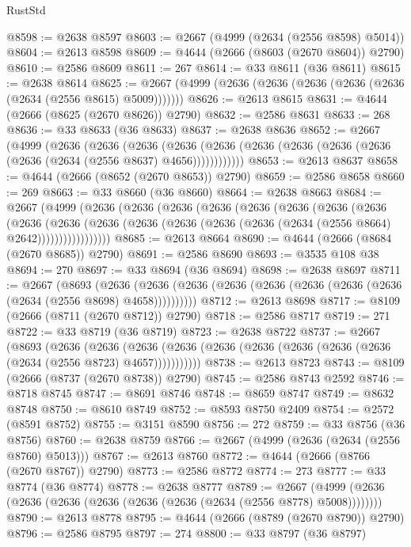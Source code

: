 \begin{lexlean}{RustStd}
\begin{coremodule}
@8598 := @2638 @8597
@8603 := @2667 (@4999 (@2634 (@2556 @8598) @5014))
@8604 := @2613 @8598
@8609 := @4644 (@2666 (@8603 (@2670 @8604)) @2790)
@8610 := @2586 @8609
@8611 := 267
@8614 := @33 @8611 (@36 @8611)
@8615 := @2638 @8614
@8625 := @2667 (@4999 (@2636 (@2636 (@2636 (@2636 (@2636 (@2634 (@2556 @8615) @5009)))))))
@8626 := @2613 @8615
@8631 := @4644 (@2666 (@8625 (@2670 @8626)) @2790)
@8632 := @2586 @8631
@8633 := 268
@8636 := @33 @8633 (@36 @8633)
@8637 := @2638 @8636
@8652 := @2667
    (@4999
      (@2636
        (@2636
          (@2636
            (@2636 (@2636 (@2636 (@2636 (@2636 (@2636 (@2636 (@2634 (@2556 @8637) @4656))))))))))))
@8653 := @2613 @8637
@8658 := @4644 (@2666 (@8652 (@2670 @8653)) @2790)
@8659 := @2586 @8658
@8660 := 269
@8663 := @33 @8660 (@36 @8660)
@8664 := @2638 @8663
@8684 := @2667
    (@4999
      (@2636
        (@2636
          (@2636
            (@2636
              (@2636
                (@2636
                  (@2636
                    (@2636
                      (@2636
                        (@2636
                          (@2636
                            (@2636 (@2636 (@2636 (@2636 (@2634 (@2556 @8664) @2642)))))))))))))))))
@8685 := @2613 @8664
@8690 := @4644 (@2666 (@8684 (@2670 @8685)) @2790)
@8691 := @2586 @8690
@8693 := @3535 @108 @38
@8694 := 270
@8697 := @33 @8694 (@36 @8694)
@8698 := @2638 @8697
@8711 := @2667
    (@8693
      (@2636 (@2636 (@2636 (@2636 (@2636 (@2636 (@2636 (@2636 (@2634 (@2556 @8698) @4658))))))))))
@8712 := @2613 @8698
@8717 := @8109 (@2666 (@8711 (@2670 @8712)) @2790)
@8718 := @2586 @8717
@8719 := 271
@8722 := @33 @8719 (@36 @8719)
@8723 := @2638 @8722
@8737 := @2667
    (@8693
      (@2636
        (@2636
          (@2636 (@2636 (@2636 (@2636 (@2636 (@2636 (@2636 (@2634 (@2556 @8723) @4657)))))))))))
@8738 := @2613 @8723
@8743 := @8109 (@2666 (@8737 (@2670 @8738)) @2790)
@8745 := @2586 @8743 @2592
@8746 := @8718 @8745
@8747 := @8691 @8746
@8748 := @8659 @8747
@8749 := @8632 @8748
@8750 := @8610 @8749
@8752 := @8593 @8750 @2409
@8754 := @2572 (@8591 @8752)
@8755 := @3151 @8590
@8756 := 272
@8759 := @33 @8756 (@36 @8756)
@8760 := @2638 @8759
@8766 := @2667 (@4999 (@2636 (@2634 (@2556 @8760) @5013)))
@8767 := @2613 @8760
@8772 := @4644 (@2666 (@8766 (@2670 @8767)) @2790)
@8773 := @2586 @8772
@8774 := 273
@8777 := @33 @8774 (@36 @8774)
@8778 := @2638 @8777
@8789 := @2667 (@4999 (@2636 (@2636 (@2636 (@2636 (@2636 (@2636 (@2634 (@2556 @8778) @5008))))))))
@8790 := @2613 @8778
@8795 := @4644 (@2666 (@8789 (@2670 @8790)) @2790)
@8796 := @2586 @8795
@8797 := 274
@8800 := @33 @8797 (@36 @8797)

\end{coremodule}
\end{lexlean}
